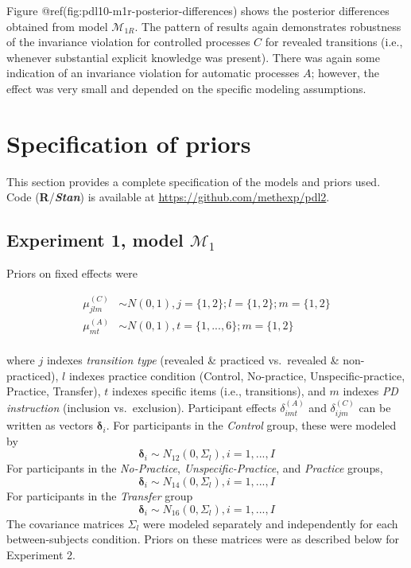 \begin{appendix}
Figure @ref(fig:pdl10-m1r-posterior-differences) shows the posterior
differences obtained from model \(\mathcal{M}_{1R}\). The pattern of
results again demonstrates robustness of the invariance violation for
controlled processes \(C\) for revealed transitions (i.e., whenever
substantial explicit knowledge was present). There was again some
indication of an invariance violation for automatic processes \(A\);
however, the effect was very small and depended on the specific modeling
assumptions.

\section{Specification of priors}\label{specification-of-priors}

This section provides a complete specification of the models and priors
used. Code (\textbf{\textsf{R}}/\textbf{\textit{Stan}}) is available at
\url{https://github.com/methexp/pdl2}.

\subsection{\texorpdfstring{Experiment 1, model
\(\mathcal{M}_1\)}{Experiment 1, model \textbackslash{}mathcal\{M\}\_1}}\label{experiment-1-model-mathcalm_1-1}

Priors on fixed effects were

\[
\begin{aligned}
\mu_{jlm}^{(C)} & \sim N(0, 1), j = \lbrace 1, 2 \rbrace; l = \lbrace 1, 2 \rbrace; m = \lbrace 1, 2 \rbrace\\
\mu_{mt}^{(A)} & \sim N(0, 1), t = \lbrace 1, ..., 6 \rbrace ; m = \lbrace 1, 2 \rbrace\\
\end{aligned}
\]

where \(j\) indexes \emph{transition type} (revealed \& practiced
vs.~revealed \& non-practiced), \(l\) indexes practice condition
(Control, No-practice, Unspecific-practice, Practice, Transfer), \(t\)
indexes specific items (i.e., transitions), and \(m\) indexes \emph{PD
instruction} (inclusion vs.~exclusion). Participant effects
\(\delta_{imt}^{(A)}\) and \(\delta_{ijm}^{(C)}\) can be written as
vectors \(\boldsymbol{\delta}_i\). For participants in the
\emph{Control} group, these were modeled by \[
\boldsymbol{\delta}_i \sim N_{12} (0, \Sigma_l), i = 1, ..., I
\] For participants in the \emph{No-Practice},
\emph{Unspecific-Practice}, and \emph{Practice} groups, \[
\boldsymbol{\delta}_i \sim N_{14} (0, \Sigma_l), i = 1, ..., I
\] For participants in the \emph{Transfer} group \[
\boldsymbol{\delta}_i \sim N_{16} (0, \Sigma_l), i = 1, ..., I
\] The covariance matrices \(\Sigma_l\) were modeled separately and
independently for each between-subjects condition. Priors on these
matrices were as described below for Experiment 2.


\end{appendix}
